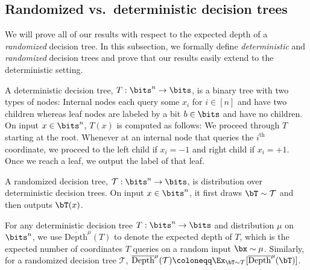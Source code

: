 \documentclass[11pt]{article}
\newcommand{\mcT}{\mathcal T}
\begin{document}
\subsection{Randomized vs.~deterministic decision trees}
We will prove all of our results with respect to the expected depth of a \emph{randomized} decision tree. In this subsection, we formally define \emph{deterministic} and \emph{randomized} decision trees and prove that our results easily extend to the deterministic setting.

\begin{definition}
    A deterministic decision tree, $T: \bits^n \to \bits$, is a binary tree with two types of nodes: Internal nodes each query some $x_i$ for $i \in [n]$ and have two children whereas leaf nodes are labeled by a bit $b \in \bits$ and have no children. On input $x \in \bits^n$, $T(x)$ is computed as follows: We proceed through $T$ starting at the root. Whenever at an internal node that queries the $i^{\text{th}}$ coordinate, we proceed to the left child if $x_i = -1$ and right child if $x_i = +1$. Once we reach a leaf, we output the label of that leaf.
\end{definition}
\begin{definition}
    A randomized decision tree, $\mcT:\bits^n \to \bits$, is distribution over deterministic decision trees. On input $x \in \bits^n$, it first draws $\bT \sim \mcT$ and then outputs $\bT(x)$.
\end{definition}
\begin{definition}
    For any deterministic decision tree $T: \bits^n \to \bits$ and distribution $\mu$ on $\bits^n$, we use $\overline{\mathrm{Depth}}^{\mu}(T)$ to denote the expected depth of $T$, which is the expected number of coordinates $T$ queries on a random input $\bx \sim \mu$. Similarly, for a randomized decision tree $\mcT$, $\overline{\mathrm{Depth}}^{\mu}(\mcT) \coloneqq \Ex_{\bT \sim \mcT}[\overline{\mathrm{Depth}}^{\mu}(\bT)]$.
\end{definition}
\end{document}
